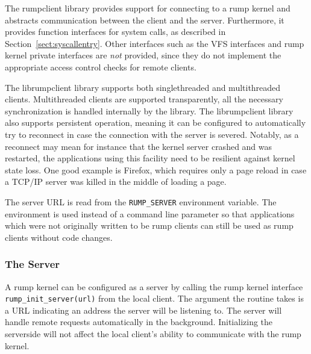 The rumpclient library provides support for connecting to a rump
kernel and abstracts communication between the client and the
server.  Furthermore, it provides function interfaces for system
calls, as described in Section~\ref{sect:syscallentry}.  Other
interfaces such as the VFS interfaces and rump kernel private
interfaces are \textit{not} provided, since they do not implement
the appropriate access control checks for remote clients.

The librumpclient library supports both singlethreaded and
multithreaded clients.  Multithreaded clients are supported
transparently, \ie all the necessary synchronization is handled
internally by the library.  The librumpclient library also supports persistent operation,
meaning it can be configured to automatically try to reconnect in
case the connection with the server is severed.  Notably, as a reconnect
may mean for instance that the kernel server crashed and was
restarted, the applications using this facility need to be
resilient against kernel state loss.  One good example is
Firefox, which requires only a page reload in case a TCP/IP server
was killed in the middle of loading a page.

The server URL is read from the \verb+RUMP_SERVER+ environment
variable.  The environment is used instead of a command line
parameter so that applications which were not originally written
to be rump clients can still be used as rump clients without code
changes.

\subsubsection{The Server}

A rump kernel can be configured as a server by calling the rump kernel
interface \verb+rump_init_server(url)+ from the local client.  The
argument the routine takes is a URL indicating an address the server will
be listening to.  The server will handle remote requests automatically
in the background.  Initializing the serverside will not affect the local
client's ability to communicate with the rump kernel.

